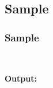 \documentclass[12pt , a4paper]{article}
\begin{document}
%
%
 


%
%

%
%
\section{}
	\subsection{Sample}

	\subsubsection{Sample}

	\begin{problemDefBox}

	\end{problemDefBox} 

	\begin{lstlisting}[language=C++]
		
	\end{lstlisting}

	\begin{tcolorbox}
	\textbf{Output:}\\

	\end{tcolorbox}
\end{document}
